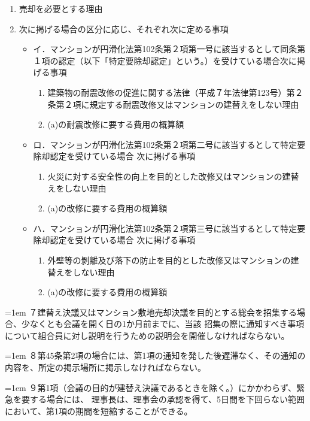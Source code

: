 \documentclass[
  luatex,
  paper=a4paper,
  fontsize=11pt,
  jafontsize=11pt,
  jlreq_notes,
]{jlreq}
\newcommand{\kou}[2]{%
  \par\noindent\hangindent=1em\hangafter=1
  #1\hspace{1em}#2%
}
\begin{document}
  \begin{enumerate}
    \item 売却を必要とする理由
    \item 次に掲げる場合の区分に応じ、それぞれ次に定める事項
      \begin{itemize}[label={}, leftmargin=2em, itemindent=-2em]
        \item イ．マンションが円滑化法第102条第２項第一号に該当するとして同条第１項の認定（以下「特定要除却認定」という。）を受けている場合次に掲げる事項
          \begin{enumerate}
            \item 建築物の耐震改修の促進に関する法律（平成７年法律第123号）第２条第２項に規定する耐震改修又はマンションの建替えをしない理由
            \item (a)の耐震改修に要する費用の概算額
          \end{enumerate}
        \item ロ．マンションが円滑化法第102条第２項第二号に該当するとして特定要除却認定を受けている場合 次に掲げる事項
          \begin{enumerate}
            \item 火災に対する安全性の向上を目的とした改修又はマンションの建替えをしない理由
            \item (a)の改修に要する費用の概算額
          \end{enumerate}
        \item ハ．マンションが円滑化法第102条第２項第三号に該当するとして特定要除却認定を受けている場合 次に掲げる事項
          \begin{enumerate}
            \item 外壁等の剝離及び落下の防止を目的とした改修又はマンションの建替えをしない理由
            \item (a)の改修に要する費用の概算額
          \end{enumerate}
      \end{itemize}
  \end{enumerate}
  \kou{７}{建替え決議又はマンション敷地売却決議を目的とする総会を招集する場合、少なくとも会議を開く日の1か月前までに、当該
  招集の際に通知すべき事項について組合員に対し説明を行うための説明会を開催しなければならない。}
  \kou{８}{第45条第2項の場合には、第1項の通知を発した後遅滞なく、その通知の内容を、所定の掲示場所に掲示しなければならない。}
  \kou{９}{第1項（会議の目的が建替え決議であるときを除く。）にかかわらず、緊急を要する場合には、
  理事長は、理事会の承認を得て、5日間を下回らない範囲において、第1項の期間を短縮することができる。}
\end{document}
